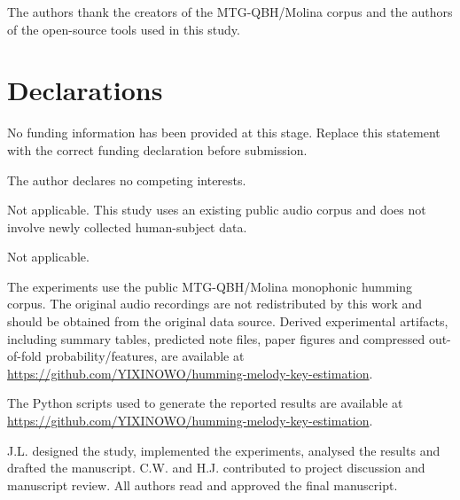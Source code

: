 \documentclass[pdflatex,sn-mathphys-num]{sn-jnl}
\begin{document}
\backmatter

The authors thank the creators of the MTG-QBH/Molina corpus and the authors of the open-source tools used in this study.

\section*{Declarations}

No funding information has been provided at this stage. Replace this statement with the correct funding declaration before submission.

The author declares no competing interests.

Not applicable. This study uses an existing public audio corpus and does not involve newly collected human-subject data.

Not applicable.

The experiments use the public MTG-QBH/Molina monophonic humming corpus. The original audio recordings are not redistributed by this work and should be obtained from the original data source. Derived experimental artifacts, including summary tables, predicted note files, paper figures and compressed out-of-fold probability/features, are available at \url{https://github.com/YIXINOWO/humming-melody-key-estimation}.

The Python scripts used to generate the reported results are available at \url{https://github.com/YIXINOWO/humming-melody-key-estimation}.

J.L. designed the study, implemented the experiments, analysed the results and drafted the manuscript. C.W. and H.J. contributed to project discussion and manuscript review. All authors read and approved the final manuscript.


\end{document}
